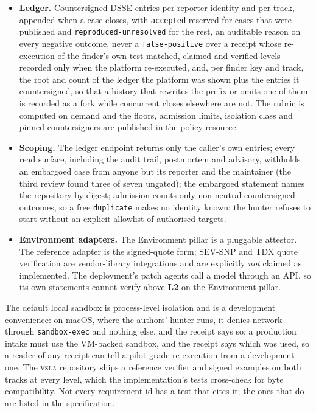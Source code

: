 \documentclass[11pt]{article}
\newcommand{\vsla}{\textsc{vsla}}
\newcommand{\lvl}[1]{\textbf{L#1}}
\begin{document}
\begin{itemize}
  \item \textbf{Ledger.} Countersigned DSSE entries per reporter identity and per track, appended when a case closes, with \texttt{accepted} reserved for cases that were published and \texttt{reproduced-unresolved} for the rest, an auditable reason on every negative outcome, never a \texttt{false-positive} over a receipt whose re-execution of the finder's own test matched, claimed and verified levels recorded only when the platform re-executed, and, per finder key and track, the root and count of the ledger the platform was shown plus the entries it countersigned, so that a history that rewrites the prefix or omits one of them is recorded as a fork while concurrent closes elsewhere are not. The rubric is computed on demand and the floors, admission limits, isolation class and pinned countersigners are published in the policy resource.
  \item \textbf{Scoping.} The ledger endpoint returns only the caller's own entries; every read surface, including the audit trail, postmortem and advisory, withholds an embargoed case from anyone but its reporter and the maintainer (the third review found three of seven ungated); the embargoed statement names the repository by digest; admission counts only non-neutral countersigned outcomes, so a free \texttt{duplicate} makes no identity known; the hunter refuses to start without an explicit allowlist of authorised targets.
  \item \textbf{Environment adapters.} The Environment pillar is a pluggable attestor. The reference adapter is the signed-quote form; SEV-SNP and TDX quote verification are vendor-library integrations and are explicitly \emph{not} claimed as implemented. The deployment's patch agents call a model through an API, so its own statements cannot verify above \lvl{2} on the Environment pillar.
\end{itemize}

The default local sandbox is process-level isolation and is a development convenience: on macOS, where the
authors' hunter runs, it denies network through \texttt{sandbox-exec} and nothing else, and the receipt says so; a
production intake must use the VM-backed sandbox, and the receipt says which was used, so a reader of any receipt
can tell a pilot-grade re-execution from a development one. The \vsla{} repository ships a reference
verifier and signed examples on both tracks at every level, which the implementation's tests cross-check for
byte compatibility. Not every requirement id has a test that cites it; the ones that do are listed in the
specification.
\end{document}
